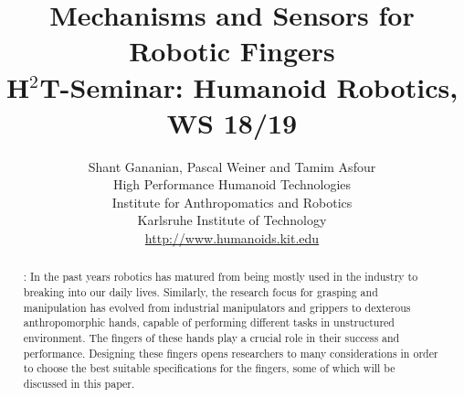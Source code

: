 \documentclass[a4paper, 10pt, conference]{ieeeconf}      %
\title{\bf {\LARGE Mechanisms and Sensors for Robotic Fingers} \\
{\normalsize H$^2$T-Seminar: Humanoid Robotics, WS 18/19}}
\author{Shant Gananian, Pascal Weiner and Tamim Asfour \\ High Performance Humanoid Technologies \\ Institute for Anthropomatics and Robotics \\ Karlsruhe Institute of Technology \\
\url{http://www.humanoids.kit.edu}}
\begin{document}
\maketitle
\thispagestyle{plain}
\pagestyle{plain}
%
\begin{abstract}
: In the past years robotics has matured from being mostly used in the industry to breaking into our daily lives. Similarly, the research focus for grasping and manipulation has evolved from industrial manipulators and grippers to dexterous anthropomorphic hands, capable of performing different tasks in unstructured environment.
The fingers of these hands play a crucial role in their success and performance. Designing these fingers opens researchers to many considerations in order to choose the best suitable specifications for the fingers, some of which will be discussed in this paper.
\end{abstract}

\end{document}
